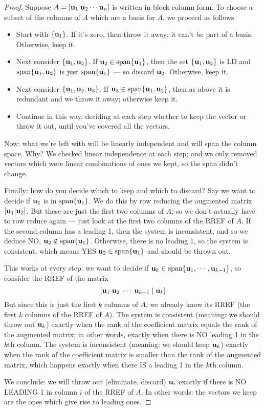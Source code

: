 \begin{proof}
Suppose $A = [\mathbf{u}_1 \; \mathbf{u}_2 \cdots \mathbf{u}_n]$ is written in block column form.  To choose a
subset of the columns of $A$ which are a basis for $A$, we
proceed as follows.

\begin{itemize}
\item Start with $\{ \mathbf{u}_1\}$.  If it's zero, then throw it away;
it can't be part of a basis.  Otherwise, keep it.
\item Next consider $\{ \mathbf{u}_1, \mathbf{u}_2\}$.  If $\mathbf{u}_2 \in \textrm{span}\{\mathbf{u}_1\}$,
then the set $\{ \mathbf{u}_1, \mathbf{u}_2\}$ is LD and $\textrm{span}\{\mathbf{u}_1,\mathbf{u}_2\}$ is
just $\textrm{span}\{\mathbf{u}_1\}$ --- so discard $\mathbf{u}_2$.  Otherwise, keep it.
\item Next consider $\{ \mathbf{u}_1, \mathbf{u}_2, \mathbf{u}_3\}$.  If $\mathbf{u}_3 \in \textrm{span}\{ \mathbf{u}_1, \mathbf{u}_2\}$, then as above it is redundant and we throw it away; otherwise keep it.
\item Continue in this way, deciding at each step whether to keep the
vector or throw it out, until you've covered all the vectors.
\end{itemize}
Now: what we're left with will be linearly independent and will span the column space.
Why?  We checked linear independence at each step; and we only
removed vectors which were linear combinations of ones we kept,
so the span didn't change.

Finally: how do you decide which to keep and which to discard?
Say we want to decide if $\mathbf{u}_2$ is in $\textrm{span}\{\mathbf{u}_1\}$.  We
do this by row reducing the augmented matrix $[\mathbf{u}_1 | \mathbf{u}_2]$.
But these are just the first two columns of $A$; so we don't actually have to
row reduce again --- just look at the first two columns of 
the RREF of $A$.  If the second column has a leading 1, then the
system is inconsistent, and so we deduce NO, $\mathbf{u}_2 \notin \textrm{span}\{\mathbf{u}_1\}$.
Otherwise, there is no leading 1, so the system is consistent, which
means YES $\mathbf{u}_2 \in \textrm{span}\{\mathbf{u}_1\}$ and should be thrown out.

This works at every step:  we want to decide if $\mathbf{u}_k \in \textrm{span}\{ \mathbf{u}_1, \cdots, \mathbf{u}_{k-1}\}$, so consider the RREF of the matrix
$$
\left[ \mathbf{u}_1 \; \mathbf{u}_2 \; \cdots \; \mathbf{u}_{k-1} \;|\; \mathbf{u}_k \right]
$$
But since this is just the first $k$ columns of $A$, we already know its
RREF (the first $k$ columns of the RREF of $A$).  The system is 
consistent (meaning: we should throw out $\mathbf{u}_k$) exactly when the rank
of the coefficient matrix equals the rank of the augmented matrix;
in other words, exactly when there is NO leading 1 in the $k$th column.
The system is inconsistent (meaning: we should keep $\mathbf{u}_k$) exactly
when the rank of the coefficient matrix is smaller than the rank of
the augmented matrix, which happens exactly when there IS a leading
1 in the $k$th column.

We conclude:  we will throw out (eliminate, discard) $\mathbf{u}_i$ exactly
if there is NO LEADING 1 in column $i$ of the RREF of $A$.  In other
words:  the vectors we keep are the ones which give rise to leading
ones.
\end{proof}

